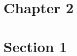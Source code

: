 \documentclass[main.tex]{subfiles}
\begin{document}
\section*{Chapter 2}





\section{Section 1}
\end{document}
